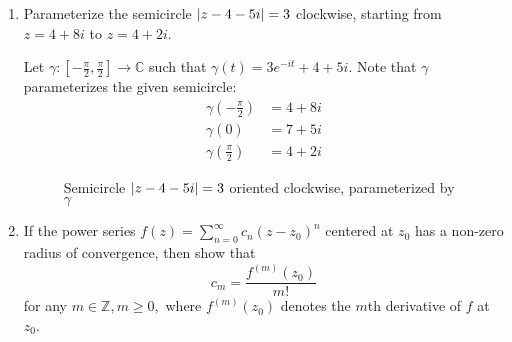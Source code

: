 \documentclass[11pt, oneside]{book}
\begin{document}
\begin{enumerate}
	\item Parameterize the semicircle $\left|z - 4 - 5i\right| = 3$ clockwise, starting from $z = 4 + 8i$ to $z = 4 + 2i$.

		\begin{solution}
			Let $\gamma: [-\frac{\pi}{2}, \frac{\pi}{2}] \to \mathbb{C}$ such that $\gamma(t) = 3e^{-it} + 4 + 5i$. Note that $\gamma$ parameterizes the given semicircle:
			\begin{align*}
				\gamma\left(-\frac{\pi}{2}\right) &= 4 + 8i \\
				\gamma(0) &= 7 + 5i \\
				\gamma\left(\frac{\pi}{2} \right) &= 4 + 2i
			\end{align*}
			\begin{figure}[H]
				\begin{center}
				\end{center}
				\caption[loftitle]{Semicircle $\left|z - 4 - 5i\right| = 3$ oriented clockwise, parameterized by $\gamma$}
			\end{figure}
		\end{solution}

	\item If the power series $f(z) = \sum_{n=0}^{\infty} c_n (z - z_0)^n$ centered at $z_0$ has a non-zero radius of convergence, then show that
		\begin{equation*}
			c_m = \frac{f^{(m)}(z_0)}{m!}
		\end{equation*}
		for any $m \in \mathbb{Z}, m \geq 0,$ where $f^{(m)}(z_0)$ denotes the $m$th derivative of $f$ at $z_0$. \label{item:tutorial_q2}


\end{enumerate}
\end{document}
